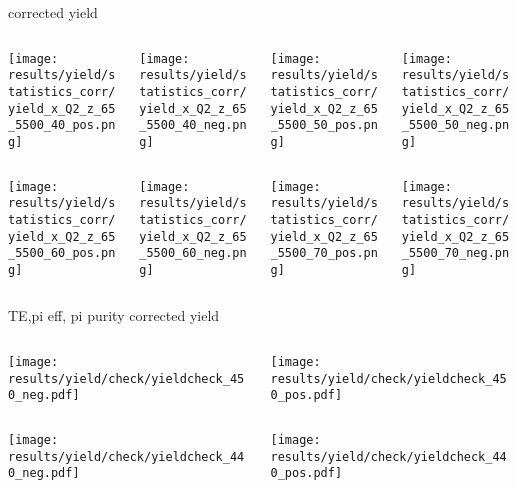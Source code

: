 \begin{frame}{corrected yield}
\begin{columns}
\begin{column}[T]{0.25\textwidth}
\texttt{[image: results/yield/statistics\_corr/yield\_x\_Q2\_z\_65\_5500\_40\_pos.png]}
\end{column}
\begin{column}[T]{0.25\textwidth}
\texttt{[image: results/yield/statistics\_corr/yield\_x\_Q2\_z\_65\_5500\_40\_neg.png]}
\end{column}
\begin{column}[T]{0.25\textwidth}
\texttt{[image: results/yield/statistics\_corr/yield\_x\_Q2\_z\_65\_5500\_50\_pos.png]}
\end{column}
\begin{column}[T]{0.25\textwidth}
\texttt{[image: results/yield/statistics\_corr/yield\_x\_Q2\_z\_65\_5500\_50\_neg.png]}
\end{column}
\end{columns}
\begin{columns}
\begin{column}[T]{0.25\textwidth}
\texttt{[image: results/yield/statistics\_corr/yield\_x\_Q2\_z\_65\_5500\_60\_pos.png]}
\end{column}
\begin{column}[T]{0.25\textwidth}
\texttt{[image: results/yield/statistics\_corr/yield\_x\_Q2\_z\_65\_5500\_60\_neg.png]}
\end{column}
\begin{column}[T]{0.25\textwidth}
\texttt{[image: results/yield/statistics\_corr/yield\_x\_Q2\_z\_65\_5500\_70\_pos.png]}
\end{column}
\begin{column}[T]{0.25\textwidth}
\texttt{[image: results/yield/statistics\_corr/yield\_x\_Q2\_z\_65\_5500\_70\_neg.png]}
\end{column}
\end{columns}
\end{frame}
\begin{frame}{TE,pi eff, pi purity corrected yield}
\begin{columns}
\begin{column}[T]{0.5\textwidth}
\texttt{[image: results/yield/check/yieldcheck\_450\_neg.pdf]}
\end{column}
\begin{column}[T]{0.5\textwidth}
\texttt{[image: results/yield/check/yieldcheck\_450\_pos.pdf]}
\end{column}
\end{columns}
\begin{columns}
\begin{column}[T]{0.5\textwidth}
\texttt{[image: results/yield/check/yieldcheck\_440\_neg.pdf]}
\end{column}
\begin{column}[T]{0.5\textwidth}
\texttt{[image: results/yield/check/yieldcheck\_440\_pos.pdf]}
\end{column}
\end{columns}
\end{frame}
